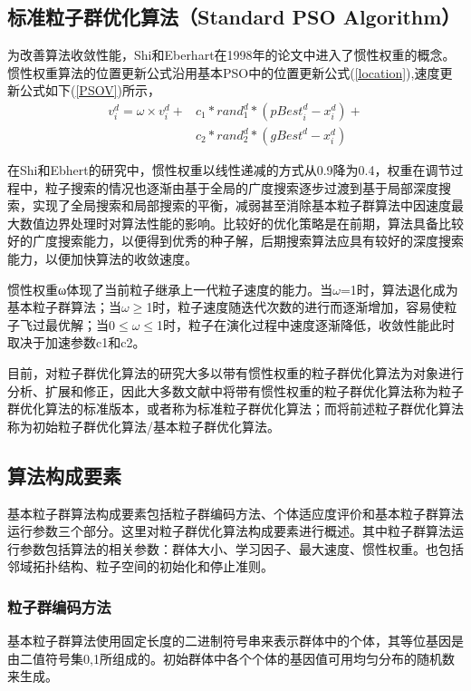 \subsection{标准粒子群优化算法（Standard PSO Algorithm）}
为改善算法收敛性能，Shi和Eberhart在1998年的论文中进入了惯性权重的概念。惯性权重算法的位置更新公式沿用基本PSO中的位置更新公式(\ref{location}),速度更新公式如下(\ref{PSOV})所示，
\begin{equation}
\begin{split}
\label{PSOV}
v_i^d=\omega\times v_i^d+&c_1*{rand}_1^d*({pBest}_i^d-x_i^d)+\\ &c_2*{rand}_2^d*({gBest}^d-x_i^d)
\end{split}
\end{equation}

在Shi和Ebhert的研究中，惯性权重以线性递减的方式从0.9降为0.4，权重在调节过程中，粒子搜索的情况也逐渐由基于全局的广度搜索逐步过渡到基于局部深度搜索，实现了全局搜索和局部搜索的平衡，减弱甚至消除基本粒子群算法中因速度最大数值边界处理时对算法性能的影响。比较好的优化策略是在前期，算法具备比较好的广度搜索能力，以便得到优秀的种子解，后期搜索算法应具有较好的深度搜索能力，以便加快算法的收敛速度。

惯性权重ω体现了当前粒子继承上一代粒子速度的能力。当$\omega$=1时，算法退化成为基本粒子群算法；当$\omega$$\ge$1时，粒子速度随迭代次数的进行而逐渐增加，容易使粒子飞过最优解；当0$\le$$\omega$$\le$1时，粒子在演化过程中速度逐渐降低，收敛性能此时取决于加速参数c1和c2。

目前，对粒子群优化算法的研究大多以带有惯性权重的粒子群优化算法为对象进行分析、扩展和修正，因此大多数文献中将带有惯性权重的粒子群优化算法称为粒子群优化算法的标准版本，或者称为标准粒子群优化算法；而将前述粒子群优化算法称为初始粒子群优化算法/基本粒子群优化算法。

\subsection{算法构成要素}
基本粒子群算法构成要素包括粒子群编码方法、个体适应度评价和基本粒子群算法运行参数三个部分。这里对粒子群优化算法构成要素进行概述。其中粒子群算法运行参数包括算法的相关参数：群体大小、学习因子、最大速度、惯性权重。也包括邻域拓扑结构、粒子空间的初始化和停止准则。
\subsubsection{粒子群编码方法}
基本粒子群算法使用固定长度的二进制符号串来表示群体中的个体，其等位基因是由二值符号集{0,1}所组成的。初始群体中各个个体的基因值可用均匀分布的随机数来生成。
